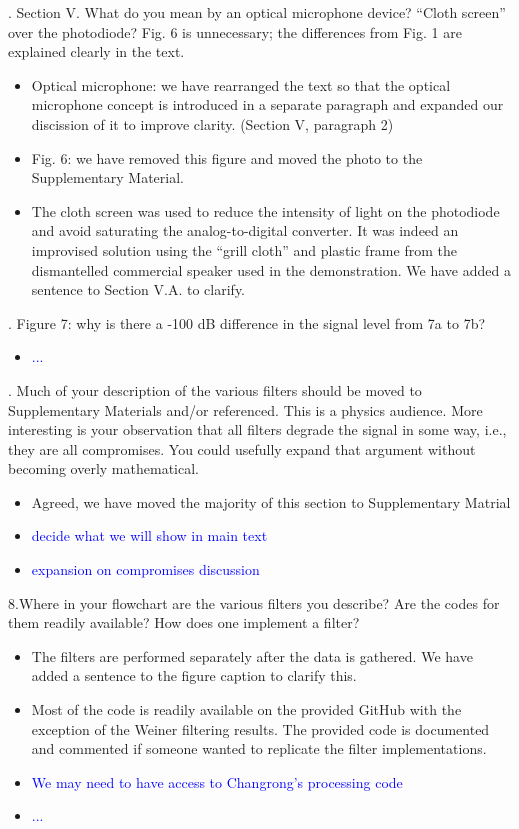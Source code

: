 \documentclass{article}
\newcommand{\todo}{\textcolor{blue}}
\begin{document}
. Section V.  What do you mean by an optical microphone device?  “Cloth screen” over the photodiode?  Fig. 6 is unnecessary; the differences from Fig. 1 are explained clearly in the text.
\begin{itemize}
\item Optical microphone: we have rearranged the text so that the optical microphone concept is introduced in a separate paragraph and expanded our discission of it to improve clarity. (Section V, paragraph 2)
\item Fig. 6: we have removed this figure and moved the photo to the Supplementary Material.
\item The cloth screen was used to reduce the intensity of light on the photodiode and avoid saturating the analog-to-digital converter. It was indeed an improvised solution using the ``grill cloth'' and plastic frame from the dismantelled commercial speaker used in the demonstration. We have added a sentence to Section V.A. to clarify.
\end{itemize}  



. Figure 7: why is there a -100 dB difference in the signal level from 7a to 7b?  
\begin{itemize}
\item \todo{...}
\end{itemize}


. Much of your description of the various filters should be moved to Supplementary Materials and/or referenced.  This is a physics audience.  More interesting is your observation that all filters degrade the signal in some way, i.e., they are all compromises.  You could usefully expand that argument without becoming overly mathematical.
\begin{itemize}
\item Agreed, we have moved the majority of this section to Supplementary Matrial
\item \todo{decide what we will show in main text}
\item \todo{expansion on compromises discussion}
\end{itemize}


\noindent 8.Where in your flowchart are the various filters you describe?  Are the codes for them readily available?  How does one implement a filter?  
\begin{itemize}
\item The filters are performed separately after the data is gathered. We have added a sentence to the figure caption to clarify this. 
\item Most of the code is readily available on the provided GitHub with the exception of the Weiner filtering results. The provided code is documented and commented if someone wanted to replicate the filter implementations.
\item \todo{We may need to have access to Changrong's processing code}
\item \todo{...}
\end{itemize}
\end{document}
